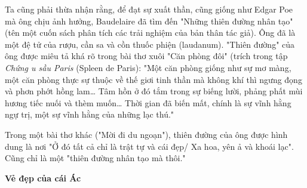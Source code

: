 \documentclass[../main.tex]{subfiles}
\begin{document}
\begin{multicols}{2}
Ta cũng phải thừa nhận rằng, để đạt sự xuất thần, cũng giống như Edgar Poe mà ông chịu ảnh hưởng, Baudelaire đã tìm đến "Những thiên đường nhân tạo" (tên một cuốn sách phân tích các trải nghiệm của bản thân tác giả). Ông đã là một đệ tử của rượu, cần sa và cồn thuốc phiện (laudanum). "Thiên đường" của ông được miêu tả khá rõ trong bài thơ xuôi "Căn phòng đôi" (trích trong tập \textit{Chứng u sầu Paris} (Spleen de Paris): "Một căn phòng giống như sự mơ màng, một căn phòng thực sự thuộc về thế giơi tinh thần mà không khí thì ngưng đọng và phơn phớt hồng lam… Tâm hồn ở đó tắm trong sự biếng lười, phảng phất mùi hương tiếc nuối và thèm muốn… Thời gian đã biến mất, chính là sự vĩnh hằng ngự trị, một sự vĩnh hằng của những lạc thú." 
 
Trong một bài thơ khác ("Mời đi du ngoạn"), thiên đường của ông được hình dung là nơi "Ở đó tất cả chỉ là trật tự và cái đẹp/ Xa hoa, yên ả và khoái lạc". Cũng chỉ là một "thiên đường nhân tạo mà thôi." 
 
 
\textbf{Vẻ đẹp của cái Ác} 
 

\end{multicols}
\end{document}
